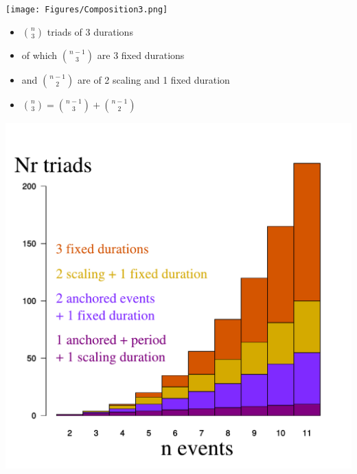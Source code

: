 \documentclass[20pt]{beamer}
\begin{document}

\begin{frame}[plain]
\Large

\begin{center}
\texttt{[image: Figures/Composition3.png]}
\end{center}
\begin{itemize}[<+->]
  \item $\binom{n}{3}$ triads of 3 durations
  \item of which $\binom{n-1}{3}$ are 3 fixed
  durations
  \item and $\binom{n-1}{2}$ are of 2 scaling and 1 fixed duration
  \item $\binom{n}{3} = \binom{n-1}{3} + \binom{n-1}{2}$
\end{itemize}
\end{frame}


\begin{frame}[plain]

\begin{center}
\includegraphics[scale=1]{Figures/id3compmarked.pdf}
\end{center}

\end{frame}
\end{document}
